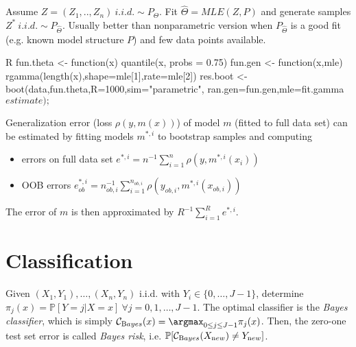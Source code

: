 \begin{sectionbox}
Assume $Z = (Z_1,..,Z_n) ~i.i.d. \sim P_{\Theta}$. Fit $\hat{\Theta} = MLE(Z, P)$ and generate samples $Z^{\ast} ~i.i.d. \sim P_{\hat{\Theta}}$. Usually better than nonparametric version when $P_{\hat{\Theta}}$ is a good fit (e.g. known model structure $P$) and few data points available.
\begin{mintlinebox}{R}
fun.theta <- function(x) {quantile(x, probs = 0.75)}
fun.gen <- function(x,mle) {rgamma(length(x),shape=mle[1],rate=mle[2])}
res.boot <- boot(data,fun.theta,R=1000,sim="parametric",
ran.gen=fun.gen,mle=fit.gamma$estimate); $
\end{mintlinebox}		
\end{sectionbox}	

\begin{sectionbox}
Generalization error (loss $\rho(y,m(x))$) of model $m$ (fitted to full data set) can be estimated by fitting models $m^{\ast,i}$ to bootstrap samples and computing
\begin{itemize}
	\item errors on full data set $e^{\ast,i} = n^{-1}\sum_{i=1}^n \rho(y,m^{\ast,i}(x_i)) $
	\item OOB errors $e^{\ast,i}_{ob} = n_{ob,i}^{-1}\sum_{i=1}^{n_{ob,i}} \rho(y_{ob,i},m^{\ast,i}(x_{ob,i})) $
\end{itemize}
The error of $m$ is then approximated by $R^{-1}\sum_{i=1}^R e^{\ast,i}$.		
\end{sectionbox}

\section{Classification}\label{sec:classification}
Given $(X_1, Y_1), \dots, (X_n,Y_n)$ i.i.d. with $Y_i \in \{0, \dots, J-1\}$, determine $\pi_j(x) = \mathbb{P}[Y=j|X=x]\ \forall j = 0,1,\dots,J-1$.
The optimal classifier is the \emph{Bayes classifier}, which is simply $\mathcal{C}_{\textrm Bayes}(x) = \argmax_{0\leq j\leq J-1}\pi_j(x)$.
Then, the zero-one test set error is called \emph{Bayes risk}, i.e. $\mathbb{P}[\mathcal{C}_{\textrm Bayes}(X_{\textrm new}) \neq Y_{\textrm new}]$.

